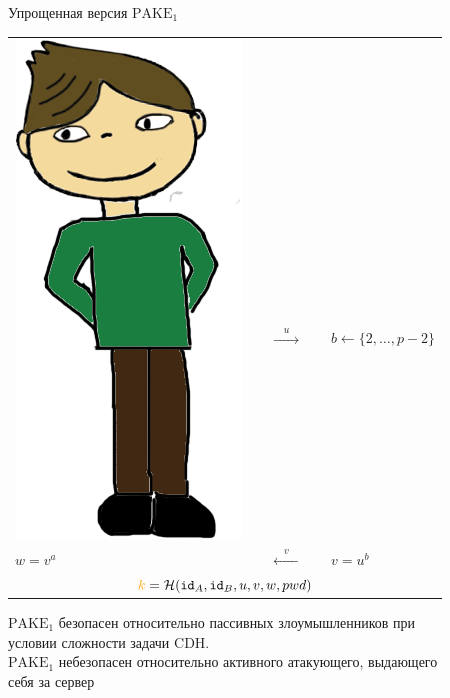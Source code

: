 \documentclass[usenames,dvipsnames,8pt,aspectratio=169]{beamer}
\begin{document}
\begin{frame}{Упрощенная версия $\text{PAKE}_1$}
\begin{center}
\begin{center}
\begin{tabular}{l c c c l}
	\multirow{2}{*}{\includegraphics[scale=0.15]{Bob}} &    \\[10pt]
	$ a \leftarrow \{2, \ldots, p-2 \}$ & & {\Huge $\xrightarrow{\quad u  \quad }$}&  &\hspace{-30pt} $b \leftarrow \{2, \ldots, p-2 \}$ \\
	\huge $w = v^a$& &  {\Huge $\xleftarrow{\quad v  \quad }$}&  & \hspace{-30pt}\huge $v = u^b$ \\[20pt]
	\multicolumn{5}{c}{ \LARGE ${\color{Orange}k} =\Hash(\mathtt{id}_{A}, \mathtt{id}_{B}, u, v, w, pwd) $}   \\
\end{tabular}
\end{center}
\end{center}
$\text{PAKE}_1$ безопасен относительно {\color{Orange} пассивных} злоумышленников  при \\ условии сложности задачи CDH. \\[5pt]
$\text{PAKE}_1$  небезопасен относительно {\color{Orange}активного} атакующего, выдающего \\ себя за сервер
\end{frame}
\end{document}
